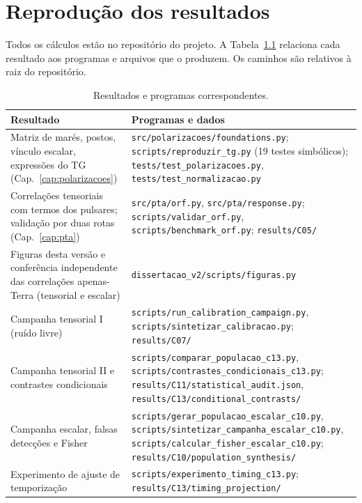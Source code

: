 \chapter{Reprodução dos resultados}
\label{ap:reproducao}

Todos os cálculos estão no repositório do projeto. A
Tabela~\ref{tab:ap-reproducao} relaciona cada resultado aos programas
e arquivos que o produzem. Os caminhos são relativos à raiz do
repositório.

\begin{table}[htbp]
\centering
\caption{Resultados e programas correspondentes.}
\label{tab:ap-reproducao}
\small
\begin{tabular}{p{}p{}}
\toprule
Resultado & Programas e dados\\
\midrule
Matriz de marés, postos, vínculo escalar, expressões do TG
(Cap.~\ref{cap:polarizacoes}) &
\texttt{src/polarizacoes/foundations.py}; \texttt{scripts/reproduzir\_tg.py}
(19 testes simbólicos); \texttt{tests/test\_polarizacoes.py},
\texttt{tests/test\_normalizacao.py}\\[1mm]
Correlações tensoriais com termos dos pulsares; validação por duas rotas
(Cap.~\ref{cap:pta}) &
\texttt{src/pta/orf.py}, \texttt{src/pta/response.py};
\texttt{scripts/validar\_orf.py}, \texttt{scripts/benchmark\_orf.py};
\texttt{results/C05/}\\[1mm]
Figuras desta versão e conferência independente das correlações
apenas-Terra (tensorial e escalar) &
\texttt{dissertacao\_v2/scripts/figuras.py}\\[1mm]
Campanha tensorial I (ruído livre) &
\texttt{scripts/run\_calibration\_campaign.py},
\texttt{scripts/sintetizar\_calibracao.py}; \texttt{results/C07/}\\[1mm]
Campanha tensorial II e contrastes condicionais &
\texttt{scripts/comparar\_populacao\_c13.py},
\texttt{scripts/contrastes\_condicionais\_c13.py};
\texttt{results/C11/statistical\_audit.json},
\texttt{results/C13/conditional\_contrasts/}\\[1mm]
Campanha escalar, falsas detecções e Fisher &
\texttt{scripts/gerar\_populacao\_escalar\_c10.py},
\texttt{scripts/sintetizar\_campanha\_escalar\_c10.py},
\texttt{scripts/calcular\_fisher\_escalar\_c10.py};
\texttt{results/C10/population\_synthesis/}\\[1mm]
Experimento de ajuste de temporização &
\texttt{scripts/experimento\_timing\_c13.py};
\texttt{results/C13/timing\_projection/}\\
\bottomrule
\end{tabular}
\end{table}

